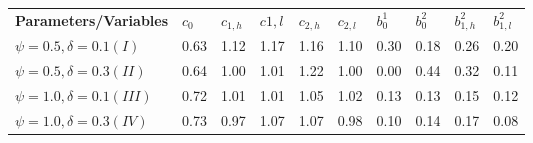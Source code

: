 \documentclass[11pt,letterpaper]{article}
\begin{document}
\begin{table}[!htbp]
\begin{tabular}{lccccccccc}
\textbf{Parameters/Variables}    & \multicolumn{1}{l}{\textbf{$c_0$}} & \multicolumn{1}{l}{\textbf{$c_{1,h}$}} & \multicolumn{1}{l}{\textbf{$c{1,l}$}} & \multicolumn{1}{l}{\textbf{$c_{2,h}$}} & \multicolumn{1}{l}{\textbf{$c_{2,l}$}} & \multicolumn{1}{l}{\textbf{$b^{1}_{0}$}} & \multicolumn{1}{l}{\textbf{$b^{2}_{0}$}} & \multicolumn{1}{l}{\textbf{$b^{2}_{1,h}$}} & \multicolumn{1}{l}{\textbf{$b^{2}_{1,l}$}} \\
\textbf{$\psi=0.5,\delta=0.1 (I)$}   & 0.63                              & 1.12                                    & 1.17                                    & 1.16                                    & 1.10                                    & 0.30                                                         & 0.18                                                         & 0.26                                                           & 0.20                                                           \\
\textbf{$\psi=0.5,\delta=0.3 (II)$}  & 0.64                              & 1.00                                    & 1.01                                    & 1.22                                    & 1.00                                    & 0.00                                                         & 0.44                                                         & 0.32                                                           & 0.11                                                           \\
\textbf{$\psi=1.0,\delta=0.1 (III)$} & 0.72                              & 1.01                                    & 1.01                                    & 1.05                                    & 1.02                                    & 0.13                                                         & 0.13                                                         & 0.15                                                           & 0.12                                                           \\
\textbf{$\psi=1.0,\delta=0.3 (IV)$}  & 0.73                              & 0.97                                    & 1.07                                    & 1.07                                    & 0.98                                    & 0.10                                                         & 0.14                                                         & 0.17                                                           & 0.08
\end{tabular}
\end{table}
\end{document}
